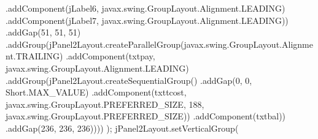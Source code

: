 \documentclass[
  10pt,
]{article}
\newenvironment{Shaded}{}{}
\newcommand{\BuiltInTok}[1]{\textcolor[rgb]{0.00,0.50,0.00}{#1}}
\newcommand{\DecValTok}[1]{\textcolor[rgb]{0.25,0.63,0.44}{#1}}
\newcommand{\FunctionTok}[1]{\textcolor[rgb]{0.02,0.16,0.49}{#1}}
\newcommand{\NormalTok}[1]{#1}
\newcommand{\OperatorTok}[1]{\textcolor[rgb]{0.40,0.40,0.40}{#1}}
\begin{document}
\begin{Shaded}
\begin{Highlighting}[numbers=left,,]
                            \OperatorTok{.}\FunctionTok{addComponent}\OperatorTok{(}\NormalTok{jLabel6}\OperatorTok{,}\NormalTok{ javax}\OperatorTok{.}\FunctionTok{swing}\OperatorTok{.}\FunctionTok{GroupLayout}\OperatorTok{.}\FunctionTok{Alignment}\OperatorTok{.}\FunctionTok{LEADING}\OperatorTok{)}
                            \OperatorTok{.}\FunctionTok{addComponent}\OperatorTok{(}\NormalTok{jLabel7}\OperatorTok{,}\NormalTok{ javax}\OperatorTok{.}\FunctionTok{swing}\OperatorTok{.}\FunctionTok{GroupLayout}\OperatorTok{.}\FunctionTok{Alignment}\OperatorTok{.}\FunctionTok{LEADING}\OperatorTok{))}
                        \OperatorTok{.}\FunctionTok{addGap}\OperatorTok{(}\DecValTok{51}\OperatorTok{,} \DecValTok{51}\OperatorTok{,} \DecValTok{51}\OperatorTok{)}
                        \OperatorTok{.}\FunctionTok{addGroup}\OperatorTok{(}\NormalTok{jPanel2Layout}\OperatorTok{.}\FunctionTok{createParallelGroup}\OperatorTok{(}\NormalTok{javax}\OperatorTok{.}\FunctionTok{swing}\OperatorTok{.}\FunctionTok{GroupLayout}\OperatorTok{.}\FunctionTok{Alignment}\OperatorTok{.}\FunctionTok{TRAILING}\OperatorTok{)}
                            \OperatorTok{.}\FunctionTok{addComponent}\OperatorTok{(}\NormalTok{txtpay}\OperatorTok{,}\NormalTok{ javax}\OperatorTok{.}\FunctionTok{swing}\OperatorTok{.}\FunctionTok{GroupLayout}\OperatorTok{.}\FunctionTok{Alignment}\OperatorTok{.}\FunctionTok{LEADING}\OperatorTok{)}
                            \OperatorTok{.}\FunctionTok{addGroup}\OperatorTok{(}\NormalTok{jPanel2Layout}\OperatorTok{.}\FunctionTok{createSequentialGroup}\OperatorTok{()}
                                \OperatorTok{.}\FunctionTok{addGap}\OperatorTok{(}\DecValTok{0}\OperatorTok{,} \DecValTok{0}\OperatorTok{,} \BuiltInTok{Short}\OperatorTok{.}\FunctionTok{MAX\_VALUE}\OperatorTok{)}
                                \OperatorTok{.}\FunctionTok{addComponent}\OperatorTok{(}\NormalTok{txttcost}\OperatorTok{,}\NormalTok{ javax}\OperatorTok{.}\FunctionTok{swing}\OperatorTok{.}\FunctionTok{GroupLayout}\OperatorTok{.}\FunctionTok{PREFERRED\_SIZE}\OperatorTok{,} \DecValTok{188}\OperatorTok{,}\NormalTok{ javax}\OperatorTok{.}\FunctionTok{swing}\OperatorTok{.}\FunctionTok{GroupLayout}\OperatorTok{.}\FunctionTok{PREFERRED\_SIZE}\OperatorTok{))}
                            \OperatorTok{.}\FunctionTok{addComponent}\OperatorTok{(}\NormalTok{txtbal}\OperatorTok{))}
                        \OperatorTok{.}\FunctionTok{addGap}\OperatorTok{(}\DecValTok{236}\OperatorTok{,} \DecValTok{236}\OperatorTok{,} \DecValTok{236}\OperatorTok{))))}
        \OperatorTok{);}
\NormalTok{        jPanel2Layout}\OperatorTok{.}\FunctionTok{setVerticalGroup}\OperatorTok{(}

\end{Highlighting}
\end{Shaded}
\end{document}
